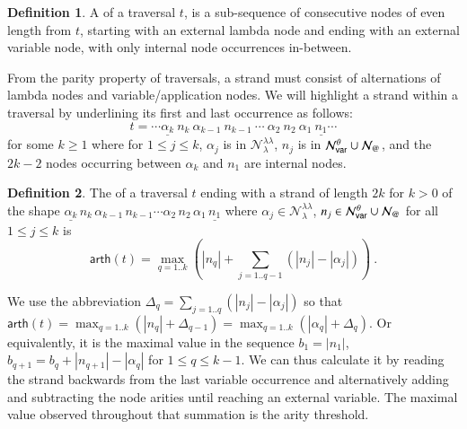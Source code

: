 \documentclass{elsarticle}
\makeatletter
\theoremstyle{plain}
\theoremstyle{definition}
\newtheorem{definition}{Definition}[section]
\theoremstyle{remark}
\newcommand\Nodes{\mathcal{N}}%
\newcommand\NodesVar{\Nodes_{\sf var}}%
\newcommand\NodesLmd{\Nodes_\lambda}%
\newcommand\NodesApp{\Nodes_@}%
\newcommand{\ghostlmd}{{\lambda\!\!\lambda}}
\newcommand{\ghostvar}{\theta}
\newcommand\ExtendedNodesVar{\NodesVar^\ghostvar}
\newcommand\ExtendedNodesLmd{\NodesLmd^\ghostlmd}
\newcommand\arth{\textsf{arth}} %
\makeatother
\begin{document}
\begin{definition}
\label{ref:strand}
A  of a traversal $t$, is a sub-sequence of consecutive nodes of even length from $t$, starting with an external lambda node and ending with an external variable node, with only internal node occurrences in-between.
\end{definition}

From the parity property of traversals, a strand must consist of alternations of lambda nodes and variable/application nodes. We will highlight a strand within a traversal by underlining its first and last occurrence as follows:
$$ t = \cdots \underline{\alpha_k}\ n_k\ \alpha_{k-1}\ n_{k-1}\ \cdots\ \alpha_2\ n_2\ \alpha_1\ \underline{n_1} \cdots $$
for some $k\geq 1$ where for $1 \leq j \leq k$, $\alpha_j$ is in $\ExtendedNodesLmd$, $n_j$ is in $\ExtendedNodesVar\union\NodesApp$, and the $2k-2$ nodes occurring between $\alpha_k$ and $n_1$ are internal nodes.

\begin{definition} %
\label{dfn:arity-threshold}
The  of a traversal $t$ ending with a strand
 of length $2k$ for $k>0$ of the shape $\underline{\alpha_k}\,n_k\,\alpha_{k-1}\,n_{k-1}\cdots \alpha_2\,n_2\, \alpha_1\,\underline{n_1}$ where $\alpha_j \in \ExtendedNodesLmd$, $n_j \in \ExtendedNodesVar\union\NodesApp$ for all $1\leq j\leq k$ is
$$
\arth(t)
  = \max_{q=1..k} \left( |n_q| + \sum_{j=1..q-1} (|n_j|-|\alpha_j|) \right) \ .
$$
\end{definition}

We use the abbreviation $\Delta_q = \sum_{j=1..q} (|n_j|-|\alpha_j|)$ so that
$\arth(t)
   = \max_{q=1..k} \left( |n_q| + \Delta_{q-1} \right)
   = \max_{q=1..k} \left( |\alpha_q| + \Delta_{q} \right)
$.
Or equivalently, it is the maximal value in the sequence $b_1 = |n_1|$, $b_{q+1} = b_q + |n_{q+1}|-|\alpha_q|$ for $1 \leq q \leq k-1$.
We can thus calculate it by reading the strand backwards from the last variable occurrence and alternatively adding and subtracting the node arities until reaching an external variable. The maximal value observed throughout that summation is the arity threshold.
\end{document}
